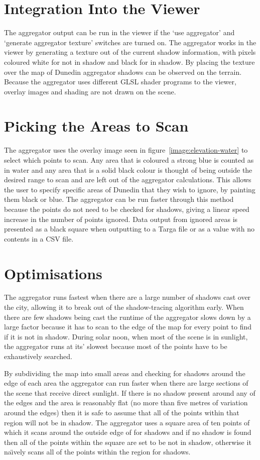 \documentclass[12pt]{report}
\begin{document}
\section{Integration Into the Viewer}
The aggregator output can be run in the viewer if the `use aggregator' and `generate aggregator texture' switches are turned on. The aggregator works in the viewer by generating a texture out of the current shadow information, with pixels coloured white for not in shadow and black for in shadow. By placing the texture over the map of Dunedin aggregator shadows can be observed on the terrain. Because the aggregator uses different GLSL shader programs to the viewer, overlay images and shading are not drawn on the scene.

\section{Picking the Areas to Scan}
The aggregator uses the overlay image seen in figure~\ref{image:elevation-water} to select which points to scan. Any area that is coloured a strong blue is counted as in water and any area that is a solid black colour is thought of being outside the desired range to scan and are left out of the aggregator calculations. This allows the user to specify specific areas of Dunedin that they wish to ignore, by painting them black or blue. The aggregator can be run faster through this method because the points do not need to be checked for shadows, giving a linear speed increase in the number of points ignored. Data output from ignored areas is presented as a black square when outputting to a Targa file or as a value with no contents in a CSV file.

\section{Optimisations}
The aggregator runs fastest when there are a large number of shadows cast over the city, allowing it to break out of the shadow-tracing algorithm early. When there are few shadows being cast the runtime of the aggregator slows down by a large factor because it has to scan to the edge of the map for every point to find if it is not in shadow. During solar noon, when most of the scene is in sunlight, the aggregator runs at its' slowest because most of the points have to be exhaustively searched.

By subdividing the map into small areas and checking for shadows around the edge of each area the aggregator can run faster when there are large sections of the scene that receive direct sunlight. If there is no shadow present around any of the edges and the area is reasonably flat (no more than five metres of variation around the edges) then it is safe to assume that all of the points within that region will not be in shadow. The aggregator uses a square area of ten points of which it scans around the outside edge of for shadows and if no shadow is found then all of the points within the square are set to be not in shadow, otherwise it na\"{\i}vely scans all of the points within the region for shadows.
\end{document}
